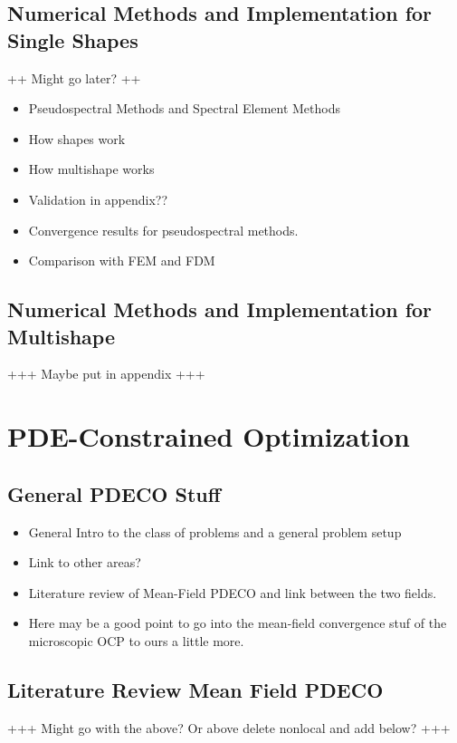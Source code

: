\documentclass[11pt, a4paper]{article}
\theoremstyle{definition}
\begin{document}
	\subsection{Numerical Methods and Implementation for Single Shapes}	
		++ Might go later? ++
	\begin{itemize}
		\item Pseudospectral Methods and Spectral Element Methods
		\item How shapes work
		\item How multishape works
		\item Validation in appendix??
		\item Convergence results for pseudospectral methods.
		\item Comparison with FEM and FDM
	\end{itemize}
	

	\subsection{Numerical Methods and Implementation for Multishape}
		
	 +++ Maybe put in appendix +++
    
    
    
    
    
    
	\section{PDE-Constrained Optimization}
	
	\subsection{General PDECO Stuff}
		\begin{itemize}
			\item General Intro to the class of problems and a general problem setup
			\item Link to other areas?
			\item Literature review of Mean-Field PDECO and link between the two fields.
			\item Here may be a good point to go into the mean-field convergence stuf of the microscopic OCP to ours a little more.
		\end{itemize}
	
	
	\subsection{Literature Review Mean Field PDECO}
	+++ Might go with the above? Or above delete nonlocal and add below? +++
	
	
\end{document}

